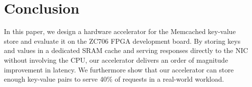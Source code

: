 \section{Conclusion}

In this paper, we design a hardware accelerator for the Memcached key-value
store and evaluate it on the ZC706 FPGA development board. By storing keys and
values in a dedicated SRAM cache and serving responses directly to the NIC 
without involving the CPU, our accelerator delivers an order of magnitude
improvement in latency. We furthermore show that our accelerator can store
enough key-value pairs to serve 40\% of requests in a real-world workload.
